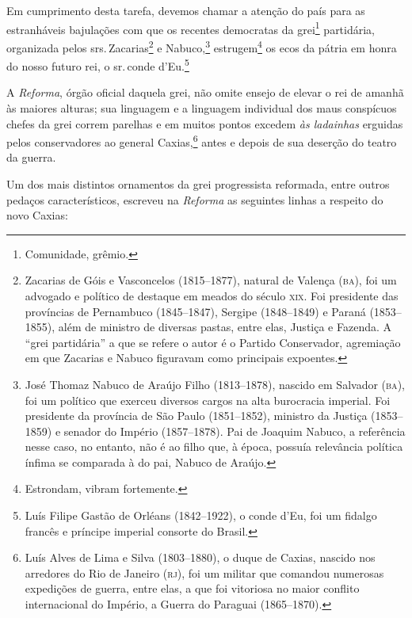 Em cumprimento desta tarefa, devemos chamar a atenção do país para as
estranháveis bajulações com que os recentes democratas da
grei\footnote{Comunidade, grêmio.} partidária, organizada pelos srs.\,Zacarias\footnote{Zacarias de Góis e Vasconcelos (1815--1877), natural
  de Valença (\textsc{ba}), foi um advogado e político de destaque em meados do
  século \textsc{xix}. Foi presidente das províncias de Pernambuco (1845--1847),
  Sergipe (1848--1849) e Paraná (1853--1855), além de ministro de diversas
  pastas, entre elas, Justiça e Fazenda. A ``grei partidária'' a que se
  refere o autor é o Partido Conservador, agremiação em que Zacarias e
  Nabuco figuravam como principais expoentes.} e Nabuco,\footnote{José
  Thomaz Nabuco de Araújo Filho (1813--1878), nascido em Salvador (\textsc{ba}),
  foi um político que exerceu diversos cargos na alta burocracia
  imperial. Foi presidente da província de São Paulo (1851--1852),
  ministro da Justiça (1853--1859) e senador do Império (1857--1878). Pai
  de Joaquim Nabuco, a referência nesse caso, no entanto, não é ao filho
  que, à época, possuía relevância política ínfima se comparada à do
  pai, Nabuco de Araújo.} estrugem\footnote{Estrondam, vibram
  fortemente.} os ecos da pátria em honra do nosso futuro rei, o sr.\,conde d'Eu.\footnote{Luís Filipe Gastão de Orléans (1842--1922), o conde
  d'Eu, foi um fidalgo francês e príncipe imperial consorte do Brasil.\label{gastao}}

A \emph{Reforma}, órgão oficial daquela grei, não omite ensejo de elevar
o rei de amanhã às maiores alturas; sua linguagem e a linguagem
individual dos maus conspícuos chefes da grei correm parelhas e em
muitos pontos excedem \emph{às ladainhas} erguidas pelos conservadores
ao general Caxias,\footnote{Luís Alves de Lima e Silva (1803--1880), o
  duque de Caxias, nascido nos arredores do Rio de Janeiro (\textsc{rj}), foi um
  militar que comandou numerosas expedições de guerra, entre elas, a que
  foi vitoriosa no maior conflito internacional do Império, a Guerra do
  Paraguai (1865--1870).} antes e depois de sua deserção do teatro da
guerra.

Um dos mais distintos ornamentos da grei progressista reformada, entre
outros pedaços característicos, escreveu na \emph{Reforma} as seguintes
linhas a respeito do novo Caxias:

